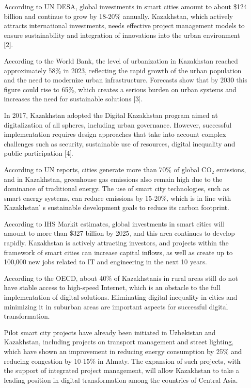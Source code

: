 \begin{multicols}{2}
According to UN DESA, global investments in smart cities amount to about
\$124 billion and continue to grow by 18-20\% annually. Kazakhstan,
which actively attracts international investments, needs effective
project management models to ensure sustainability and integration of
innovations into the urban environment {[}2{]}.

According to the World Bank, the level of urbanization in Kazakhstan
reached approximately 58\% in 2023, reflecting the rapid growth of the
urban population and the need to modernize urban infrastructure.
Forecasts show that by 2030 this figure could rise to 65\%, which
creates a serious burden on urban systems and increases the need for
sustainable solutions {[}3{]}.

In 2017, Kazakhstan adopted the Digital Kazakhstan program aimed at
digitalization of all spheres, including urban governance. However,
successful implementation requires design approaches that take into
account complex challenges such as security, sustainable use of
resources, digital inequality and public participation {[}4{]}.

According to UN reports, cities generate more than 70\% of global CO₂
emissions, and in Kazakhstan, greenhouse gas emissions also remain high
due to the dominance of traditional energy. The use of smart city
technologies, such as smart energy systems, can reduce emissions by
15-20\%, which is in line with Kazakhstan' s sustainable
development goals to reduce its carbon footprint.

According to IHS Markit estimates, global investments in smart cities
will amount to more than \$327 billion by 2025, and this area continues
to develop rapidly. Kazakhstan is actively attracting investors, and
projects within the framework of smart cities can increase capital
inflows, as well as create up to 100,000 new jobs related to IT and
engineering in the next 10 years.

According to the OECD, about 40\% of Kazakhstanis in rural areas still
do not have stable access to high-speed Internet, which is an obstacle
to the full implementation of digital solutions. Eliminating digital
inequality in cities and minimizing it in suburban areas are important
aspects for successful digital transformation.

Pilot smart city projects have already been initiated in Uzbekistan and
Kazakhstan, including projects on transport management and street
lighting, which have shown an improvement in reducing energy consumption
by 25\% and reducing congestion by 10-15\% in Almaty. The expansion of
such projects, with the support of integrated project management, will
allow Kazakhstan to take a leading position in digital transformation
among the countries of Central Asia.


\end{multicols}
